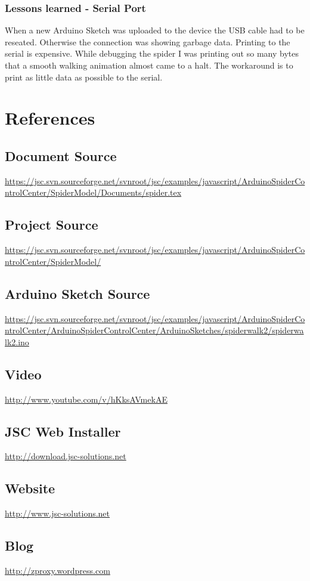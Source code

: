 \documentclass[12pt,leqno]{book}
\begin{document}
\subsection{Lessons learned - Serial Port}

When a new Arduino Sketch was uploaded to the device the USB cable had to be reseated. Otherwise the connection was showing garbage data. Printing to the serial is expensive. While debugging the spider I was printing out so many bytes that a smooth walking animation almost came to a halt. The workaround is to print as little data as possible to the serial.







\chapter{References}

\section{Document Source}

\url{https://jsc.svn.sourceforge.net/svnroot/jsc/examples/javascript/ArduinoSpiderControlCenter/SpiderModel/Documents/spider.tex}

\section{Project Source}
\url{https://jsc.svn.sourceforge.net/svnroot/jsc/examples/javascript/ArduinoSpiderControlCenter/SpiderModel/}

\section{Arduino Sketch Source}
\url{https://jsc.svn.sourceforge.net/svnroot/jsc/examples/javascript/ArduinoSpiderControlCenter/ArduinoSpiderControlCenter/ArduinoSketches/spiderwalk2/spiderwalk2.ino}


\section{Video}
\url{http://www.youtube.com/v/hKksAVmekAE}

\section{JSC Web Installer}
\url{http://download.jsc-solutions.net}

\section{Website}
\url{http://www.jsc-solutions.net}

\section{Blog}
\url{http://zproxy.wordpress.com}
\end{document}

